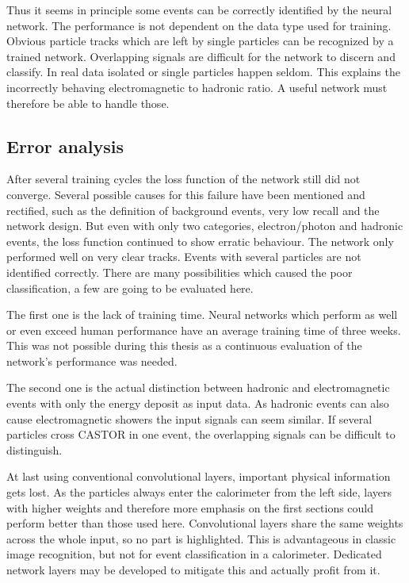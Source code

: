Thus it seems in principle some events can be correctly identified by the neural network. The performance is not dependent on the data type used for training. Obvious particle tracks which are left by single particles can be recognized by a trained network. Overlapping signals are difficult for the network to discern and classify. In real data isolated or single particles happen seldom. This explains the incorrectly behaving electromagnetic to hadronic ratio. A useful network must therefore be able to handle those.

\subsection{Error analysis}
After several training cycles the loss function of the network still did not converge. Several possible causes for this failure have been mentioned and rectified, such as the definition of background events, very low recall and the network design. But even with only two categories, electron/photon and hadronic events, the loss function continued to show erratic behaviour. The network only performed well on very clear tracks. Events with several particles are not identified correctly. There are many possibilities which caused the poor classification, a few are going to be evaluated here.

The first one is the lack of training time. Neural networks which perform as well or even exceed human performance have an average training time of three weeks. This was not possible during this thesis as a continuous evaluation of the network's performance was needed. 

The second one is the actual distinction between hadronic and electromagnetic events with only the energy deposit as input data. As hadronic events can also cause electromagnetic showers the input signals can seem similar. If several particles cross CASTOR in one event, the overlapping signals can be difficult to distinguish. 

At last using conventional convolutional layers, important physical information gets lost. As the particles always enter the calorimeter from the left side, layers with higher weights and therefore more emphasis on the first sections could perform better than those used here. Convolutional layers share the same weights across the whole input, so no part is highlighted. This is advantageous in classic image recognition, but not for event classification in a calorimeter. Dedicated network layers may be developed to mitigate this and actually profit from it.
